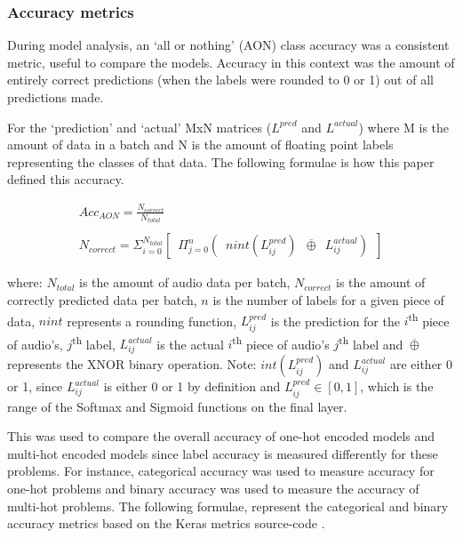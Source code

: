 \documentclass[12pt]{article}
\begin{document}
    \subsubsection{Accuracy metrics}
    During model analysis, an `all or nothing' (AON) class accuracy was a consistent metric, useful to compare the models. Accuracy in this context was the amount of entirely correct predictions (when the labels were rounded to 0 or 1) out of all predictions made.\medskip
    
	For the `prediction' and `actual' MxN matrices ($L^{pred}$ and $L^{actual}$) where M is the amount of data in a batch and N is the amount of floating point labels representing the classes of that data. The following formulae is how this paper defined this accuracy.\medskip
    
    \newpage
    \begin{gather*}
    	Acc_{AON} = \frac{N_{correct}}{N_{total}}\\\\
    	N_{correct} = \Sigma_{i=0}^{N_{total}}\left[\enspace\Pi_{j=0}^{n}\left(\enspace nint(L_{ij}^{pred})\enspace\overline{\oplus}\enspace L_{ij}^{actual}\right)\enspace\right]
	\end{gather*}
	
	\begin{footnotesize}
	    where: $N_{total}$ is the amount of audio data per batch, $N_{correct}$ is the amount of correctly predicted data per batch, $n$ is the number of labels for a given piece of data, $nint$ represents a rounding function, $L_{ij}^{pred}$ is the prediction for the $i$\textsuperscript{th} piece of audio's, $j$\textsuperscript{th} label, $L_{ij}^{actual}$ is the actual $i$\textsuperscript{th} piece of audio's  $j$\textsuperscript{th} label and $\overline{\oplus}$ represents the XNOR binary operation. Note: $int(L_{ij}^{pred})$ and $L_{ij}^{actual}$ are either 0 or 1, since $L_{ij}^{actual}$ is either 0 or 1 by definition and $L_{ij}^{pred} \in [0, 1]$, which is the range of the Softmax and Sigmoid functions on the final layer.
	\end{footnotesize}\bigskip
	
	This was used to compare the overall accuracy of one-hot encoded models and multi-hot encoded models since label accuracy is measured differently for these problems. For instance, categorical accuracy was used to measure accuracy for one-hot problems and binary accuracy was used to measure the accuracy of multi-hot problems. The following formulae, represent the categorical and binary accuracy metrics based on the Keras metrics source-code \parencite{Keras}.\medskip
	
\end{document}
